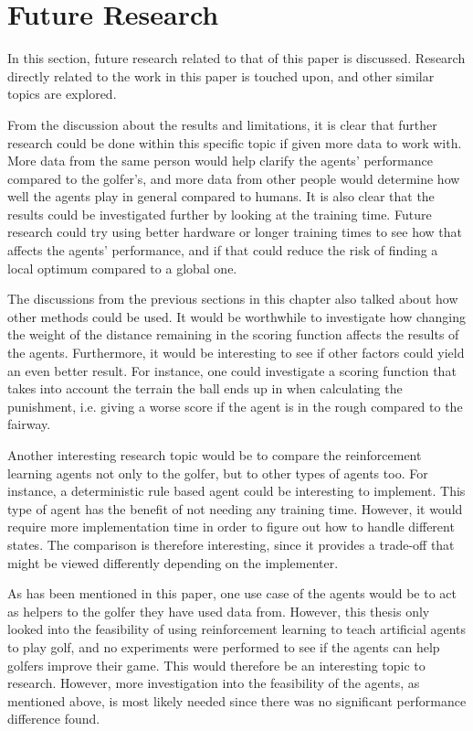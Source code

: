 \documentclass{kththesis}
\begin{document}
\section{Future Research}
In this section, future research related to that of this paper is discussed. Research directly related to the work in this paper is touched upon, and other similar topics are explored.

From the discussion about the results and limitations, it is clear that further research could be done within this specific topic if given more data to work with. More data from the same person would help clarify the agents' performance compared to the golfer's, and more data from other people would determine how well the agents play in general compared to humans. It is also clear that the results could be investigated further by looking at the training time. Future research could try using better hardware or longer training times to see how that affects the agents' performance, and if that could reduce the risk of finding a local optimum compared to a global one.

The discussions from the previous sections in this chapter also talked about how other methods could be used. It would be worthwhile to investigate how changing the weight of the distance remaining in the scoring function affects the results of the agents. Furthermore, it would be interesting to see if other factors could yield an even better result. For instance, one could investigate a scoring function that takes into account the terrain the ball ends up in when calculating the punishment, i.e. giving a worse score if the agent is in the rough compared to the fairway. 

Another interesting research topic would be to compare the reinforcement learning agents not only to the golfer, but to other types of agents too. For instance, a deterministic rule based agent could be interesting to implement. This type of agent has the benefit of not needing any training time. However, it would require more implementation time in order to figure out how to handle different states. The comparison is therefore interesting, since it provides a trade-off that might be viewed differently depending on the implementer.

As has been mentioned in this paper, one use case of the agents would be to act as helpers to the golfer they have used data from. However, this thesis only looked into the feasibility of using reinforcement learning to teach artificial agents to play golf, and no experiments were performed to see if the agents can help golfers improve their game. This would therefore be an interesting topic to research. However, more investigation into the feasibility of the agents, as mentioned above, is most likely needed since there was no significant performance difference found. 
\end{document}
